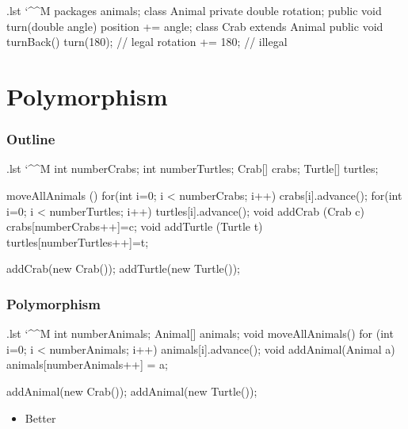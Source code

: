 \documentclass[10pt, handout]{beamer}
\makeatletter
\newenvironment{code}{%
  \begingroup
  \@bsphack
  \immediate\openout\lstvrb@out\jobname.lst
  \let\do\@makeother\dospecials\catcode`\^^M\active
  \def\verbatim@processline{%
    \immediate\write\lstvrb@out{\the\verbatim@line}}%
  \verbatim@start}{%
  \immediate\closeout\lstvrb@out
  \@esphack
  \endgroup
  
  \begin{alertblock}{}
    
  \end{alertblock}}
\makeatother
\begin{document}
\begin{frame}[fragile]
\begin{code}
packages animals;
class Animal {
  private double rotation;
  public void turn(double angle)
    {position += angle;} 
}
class Crab extends Animal {
  public void turnBack() {
    turn(180);       // legal
    rotation += 180; // illegal
  }
}
\end{code}
\end{frame}

\section{Polymorphism}
\begin{frame}
  \frametitle{Outline}
  \tableofcontents[currentsection]
\end{frame}

\begin{frame}
  \begin{itemize}
  \end{itemize}
    \begin{code}
  int numberCrabs; int numberTurtles;
  Crab[] crabs;
  Turtle[] turtles;
  
  moveAllAnimals () {
    for(int i=0; i < numberCrabs; i++)
      crabs[i].advance();
    for(int i=0; i < numberTurtles; i++)
      turtles[i].advance();
  }
  void addCrab (Crab c) {crabs[numberCrabs++]=c;}
  void addTurtle (Turtle t) 
    {turtles[numberTurtles++]=t;}
  
  addCrab(new Crab());
  addTurtle(new Turtle());
    \end{code}
\end{frame}

\begin{frame}[fragile]
  \frametitle{Polymorphism}

  \begin{code}
  int numberAnimals;
  Animal[] animals;
  void moveAllAnimals(){
    for (int i=0; i < numberAnimals; i++)
      animals[i].advance();
  }
  void addAnimal(Animal a)
    {animals[numberAnimals++] = a;} 
  
  addAnimal(new Crab());
  addAnimal(new Turtle());
  \end{code}

\begin{itemize}
    \item \alert{\huge{Better}}
\end{itemize}
\end{frame}
\end{document}
